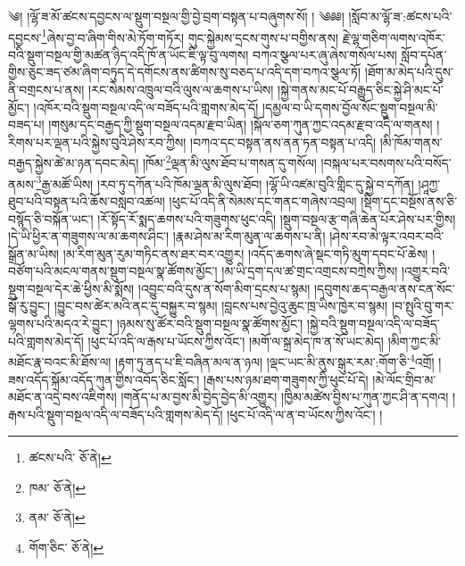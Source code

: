 \setcounter{footnote}{0} 
༄། །ལྷོ་ཟ་མོ་ཚངས་དབྱངས་ལ་སྡུག་བསྔལ་གྱི་བྱེ་བྲག་བསྟན་པ་བཞུགས་སོ། ། ༄༅༅། །སློབ་མ་ལྷོ་ཟ་:ཚངས་པའི་དབྱངས་\footnote{ཚངས་པའི་  ཅོ་ནེ། }ཞེས་བྱ་བ་ཞིག་གིས་མེ་ཏོག་གཏོར། གུང་སྐྱེམས་དྲངས་གུས་པ་བགྱིས་ནས། རྗེ་ལྷ་གཅིག་ལགས་འཁོར་བའི་སྡུག་བསྔལ་གྱི་མཚན་ཉིད་འདི་ཁོ་ན་ཡོང་ཇི་ལྟ་བུ་ལགས། བཀའ་སྩལ་པར་ཞུ་ཞེས་གསོལ་པས། སློབ་དཔོན་གྱིས་ཅུང་ཟད་ཙམ་ཞིག་བཏུད་དེ་དགོངས་ནས་ཚིགས་སུ་བཅད་པ་འདི་དག་བཀའ་སྩལ་ཏོ། །ཐོག་མ་མེད་པའི་དུས་ནི་བགྲངས་པ་ནས། །རང་སེམས་འཁྲུལ་བའི་ལུས་ལ་ཆགས་པ་ཡིས། །སྐྱེ་གནས་མང་པོ་བརྒྱུད་ཅིང་སྐྱེ་ཤི་མང་པོ་མྱོང་། །འཁོར་བའི་སྡུག་བསྔལ་འདི་ལ་བཟོད་པའི་གླགས་མེད་དོ། །དམྱལ་བ་ཡི་དགས་བྱོལ་སོང་སྡུག་བསྔལ་མི་བཟད་པ། །གསུམ་དང་བརྒྱད་ཀྱི་སྡུག་བསྔལ་འདམ་རྫབ་ཡིན། །སྐོལ་ཅག་ཀུན་ཀྱང་འདམ་རྫབ་འདི་ལ་གནས། །རིགས་པར་ལྡན་པའི་སྐྱེས་བུའི་ཤེས་རབ་ཀྱིས། །བཀའ་དང་བསྟན་ནས་ནན་ཏན་བསྟན་པ་འདི། །མི་ཁོམ་གནས་བརྒྱད་སྐྱེས་ཚེ་མ་ཉན་དབང་མེད། །ཁོམ་\footnote{ཁམ་  ཅོ་ནེ། }ལྡན་མི་ལུས་ཐོབ་པ་གསན་དུ་གསོལ། །བསྐལ་པར་བསགས་པའི་བསོད་ནམས་\footnote{ནམ་  ཅོ་ནེ། }རྒྱ་མཚོ་ཡིས། །རབ་ཏུ་དཀོན་པའི་ཁོམ་ལྡན་མི་ལུས་ཐོབ། །ལྷོ་ཡི་འཛམ་བུའི་གླིང་དུ་སྐྱེ་བ་དཀོན། །ཤཱཀྱ་ཐུབ་པའི་བསྟན་པའི་ཆོས་བསླབ་འཚལ། །ཕུང་པོ་འདི་ནི་སེམས་དང་གནང་གཞེས་འབྲལ། །སྡིག་དང་བསྔོས་ནས་ཅི་བསྙོད་ཅི་བསྐོན་ཡང་། །རོ་སྟོད་རོ་སྨད་ཆགས་པའི་གཟུགས་ཕུང་འདི། །སྡུག་བསྔལ་རྩ་གཞི་ཆེན་པོར་ཤེས་པར་གྱིས། །དེ་ཡི་ཕྱིར་ན་གཟུགས་ལ་མ་ཆགས་ཤིང་། །རྣམ་ཤེས་མ་རིག་མུན་ལ་ཆགས་པ་ནི། །ཤེས་རབ་མེ་ལྟར་འབར་བའི་སྒྲོན་མ་ཡིས། །མ་རིག་མུན་རུམ་གཏིང་ནས་ཐར་བར་འགྱུར། །འདོད་ཆགས་ཞེ་སྡང་གཏི་མུག་དབང་པོ་ཆེས། །བཙོག་པའི་མངལ་གནས་སྡུག་བསྔལ་སྣ་ཚོགས་མྱོང་། །མ་ཡི་དྲག་དལ་ཚ་གྲང་འགྲངས་བཀྲེས་ཀྱིས། །འགྱུར་བའི་སྡུག་བསྔལ་དེར་ཆེ་ཕྱིས་མི་སྨོས། །འབྱུང་བའི་དུས་ན་སོག་མིག་དྲངས་པ་སྙམ། །དབུགས་ཆད་བརྒྱལ་ནས་ངན་སོང་སྒོ་རུ་བྱུང་། །བྱུང་བས་ཚེར་མའི་ནང་དུ་བསྐྱུར་བ་སྙམ། །བླངས་པས་བྱེའུ་ཆུང་ཁྲ་ཡིས་ཁྱེར་བ་སྙམ། །བ་སྤུའི་བུ་གར་ལྷགས་པའི་མདའ་རེ་བྱུང་། །ཉམས་སུ་ཚོར་བའི་སྡུག་བསྔལ་སྣ་ཚོགས་མྱོང་། །སྐྱེ་བའི་སྡུག་བསྔལ་འདི་ལ་བཟོད་པའི་གླགས་མེད་དོ། །ཕུང་པོ་འདི་ལ་རྒས་པ་ཡོངས་ཀྱིས་འོང་། །མགོ་ལ་སྐྲ་མེད་ཁ་ན་སོ་ཡང་མེད། །མིག་ཀྱང་མི་མཐོང་རྣ་བའང་མི་ཐོས་ལ། །རྟག་ཏུ་ནད་པ་ཇི་བཞིན་མལ་ན་ཉལ། །ལྡང་ཡང་མི་ནུས་སྒུར་རམ་:གོག་ཅི་\footnote{གོག་ཅིང་  ཅོ་ནེ། }འགྲོ། །ཟས་འདོད་སྐོམ་འདོད་ཀུན་གྱིས་འབོད་ཅིང་སློང་། །རྒས་པས་ཉམ་ཐག་གཟུགས་ཀྱི་ཕུང་པོ་དེ། །མེ་ལོང་གྲིབ་མ་མཐོང་ན་འདྲེ་བས་འཇིགས། །གནོད་པ་མ་བྱས་མི་བྱེད་བྱེད་མི་འགྱུར། །ཁྱིམ་མཚེས་བྱིས་པ་ཀུན་ཀྱང་ཤི་ན་དགའ། །རྒས་པའི་སྡུག་བསྔལ་འདི་ལ་བཟོད་པའི་གླགས་མེད་དོ། །ཕུང་པོ་འདི་ལ་ན་བ་ཡོངས་ཀྱིས་འོང་། །
